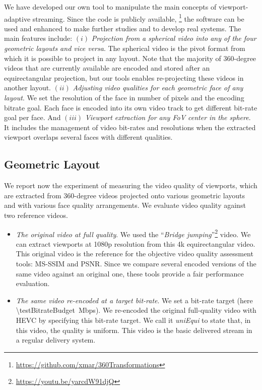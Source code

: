 We have developed our own tool to manipulate the main concepts
of viewport-adaptive streaming. Since the code is publicly available,%
\footnote{\url{https://github.com/xmar/360Transformations}} the software can be used and enhanced
to make further studies and to develop real systems. The main
features include: $(i)$ \emph{Projection from a spherical video into any of the four
geometric layouts and vice versa}. The spherical video is the pivot format from which it
is possible to project in any layout.
Note that the majority of 360-degree videos that are currently available are encoded and stored after
an equirectangular projection, but our tools enables re-projecting these videos
in another layout. 
$(ii)$ \emph{Adjusting video qualities for each
geometric face of any
layout}. We set the resolution of the face in number of
pixels and the encoding bitrate goal. Each face is encoded into its own video
track to get different
bit-rate goal per face. And $(iii)$ \emph{Viewport extraction for any \ac{FoV} center in the
sphere}. It includes the management of video bit-rates and resolutions
when the extracted viewport overlaps several faces with different qualities.

\subsection{Geometric Layout}

We report now the experiment of measuring the video quality of viewports, which
are extracted from 360-degree videos projected onto various geometric layouts and
with various
face quality arrangements. We evaluate video quality against two reference videos.
\begin{itemize}[leftmargin=7pt, itemindent=0pt, topsep=2pt, itemsep=0pt]
\item \emph{The original video at full quality}. We used the
``\emph{Bridge
jumping}''\footnote{\url{https://youtu.be/yarcdW91djQ}} video. We can extract viewports at 1080p resolution from this 4k equirectangular
video. This original video
is the reference for the objective video quality assessment tools: \ac{MS-SSIM} and
\ac{PSNR}. Since we compare several encoded versions of the same video against an original
one, these tools provide
a fair performance evaluation.
\item \emph{The same video re-encoded at a target bit-rate}. We set
a bit-rate target (here \SI{\testBitrateBudget}{\mega bps}). We
re-encoded the original full-quality video with \ac{HEVC} by specifying this bit-rate target. We call it \emph{uniEqui} to state that, in this
video, the quality is uniform. This video is the basic delivered stream in a regular delivery
system.
\end{itemize}

